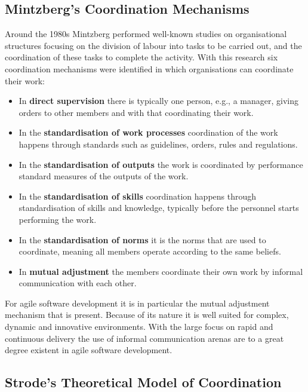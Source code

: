 \subsection{Mintzberg's Coordination Mechanisms}


Around the 1980s Mintzberg performed well-known studies on organisational structures focusing on the division of labour into tasks to be carried out, and the coordination of these tasks to complete the activity. With this research six coordination mechanisms were identified in which organisations can coordinate their work:

\begin{itemize}
  \item In \textbf{direct supervision} there is typically one person, e.g., a manager, giving orders to other members and with that coordinating their work.
  \item In the \textbf{standardisation of work processes} coordination of the work happens through standards such as guidelines, orders, rules and regulations.
  \item In the \textbf{standardisation of outputs} the work is coordinated by performance standard measures of the outputs of the work.
  \item In the \textbf{standardisation of skills} coordination happens through standardisation of skills and knowledge, typically before the personnel starts performing the work.
  \item In the \textbf{standardisation of norms} it is the norms that are used to coordinate, meaning all members operate according to the same beliefs.
  \item In \textbf{mutual adjustment} the members coordinate their own work by informal communication with each other.
\end{itemize}

For agile software development it is in particular the mutual adjustment mechanism that is present. Because of its nature it is well suited for complex, dynamic and innovative environments. With the large focus on rapid and continuous delivery the use of informal communication arenas are to a great degree existent in agile software development.

\subsection{Strode's Theoretical Model of Coordination}
\label{strodechap}


